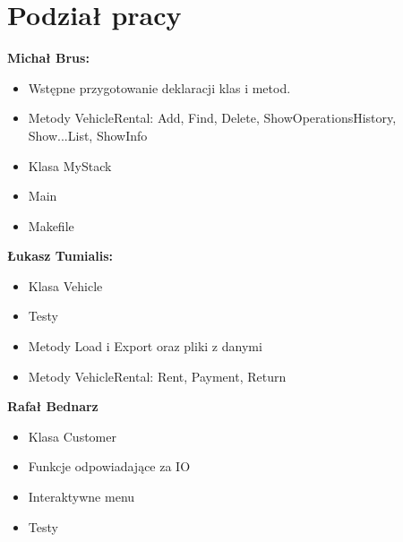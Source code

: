 \documentclass[10pt, a4paper] {article}
\begin{document}
\section{Podział pracy}

\textbf{Michał Brus:}
\begin{itemize}
	\item Wstępne przygotowanie deklaracji klas i metod. 
	\item Metody VehicleRental: Add, Find, Delete, ShowOperationsHistory, Show...List, ShowInfo
	\item Klasa MyStack
	\item Main
	\item Makefile
\end{itemize}
\textbf{Łukasz Tumialis:}
\begin{itemize}
	\item Klasa Vehicle
	\item Testy
	\item Metody Load i Export oraz pliki z danymi 
	\item Metody VehicleRental: Rent, Payment, Return
\end{itemize} 
\textbf{Rafał Bednarz}
\begin{itemize}
	\item Klasa Customer
	\item Funkcje odpowiadające za IO
	\item Interaktywne menu
	\item Testy
\end{itemize}
\end{document}
